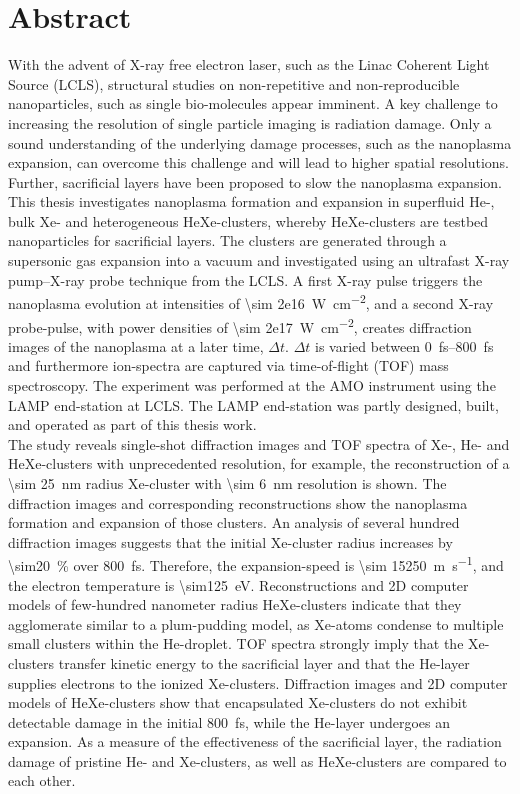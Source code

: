 \section*{Abstract}\label{ch:abstract}
With the advent of X-ray free electron laser, such as the Linac Coherent Light Source (LCLS), structural studies on non-repetitive and non-reproducible nanoparticles, such as single bio-molecules appear imminent. A key challenge to increasing the resolution of single particle imaging is radiation damage. Only a sound understanding of the underlying damage processes, such as the nanoplasma expansion, can overcome this challenge and will lead to higher spatial resolutions. Further, sacrificial layers have been proposed to slow the nanoplasma expansion.\\[0.4\baselineskip]
%
This thesis investigates nanoplasma formation and expansion in superfluid He-, bulk Xe- and heterogeneous HeXe-clusters, whereby HeXe-clusters are testbed nanoparticles for sacrificial layers. The clusters are generated through a supersonic gas expansion into a vacuum and investigated using an ultrafast X-ray pump--X-ray probe technique from the LCLS. A first X-ray pulse triggers the nanoplasma evolution at intensities of \SI{\sim 2e16}{\watt\per\square\centi\meter}, and a second X-ray probe-pulse, with power densities of \SI{\sim 2e17}{\watt\per\square\centi\meter}, creates diffraction images of the nanoplasma at a later time, $\Delta t$. $\Delta t$ is varied between \SIrange{0}{800}{\femto\second} and furthermore ion-spectra are captured via time-of-flight (TOF) mass spectroscopy. The experiment was performed at the AMO instrument using the LAMP end-station at LCLS. The LAMP end-station was partly designed, built, and operated as part of this thesis work.\\[0.4\baselineskip]
%
The study reveals single-shot diffraction images and TOF spectra of Xe-, He- and HeXe-clusters with unprecedented resolution, for example, the reconstruction of a \SI{\sim 25}{\nano\meter} radius Xe-cluster with \SI{\sim 6}{\nano\meter} resolution is shown. The diffraction images and corresponding reconstructions show the nanoplasma formation and expansion of those clusters. An analysis of several hundred diffraction images suggests that the initial Xe-cluster radius increases by \SI{\sim20}{\percent} over \SI{800}{\femto\second}. Therefore, the expansion-speed is \SI{\sim 15250}{\meter\per\second}, and the electron temperature is \SI{\sim125}{\electronvolt}. Reconstructions and 2D computer models of few-hundred nanometer radius HeXe-clusters indicate that they agglomerate similar to a plum-pudding model, as Xe-atoms condense to multiple small clusters within the He-droplet. TOF spectra strongly imply that the Xe-clusters transfer kinetic energy to the sacrificial layer and that the He-layer supplies electrons to the ionized Xe-clusters. Diffraction images and 2D computer models of HeXe-clusters show that encapsulated Xe-clusters do not exhibit detectable damage in the initial \SI{800}{\femto\second}, while the He-layer undergoes an expansion. As a measure of the effectiveness of the sacrificial layer, the radiation damage of pristine He- and Xe-clusters, as well as HeXe-clusters are compared to each other.
%
%
%
%